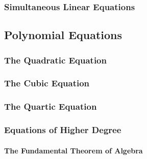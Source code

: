 \subsubsection{Simultaneous Linear Equations}






\subsection{Polynomial Equations}

\subsubsection{The Quadratic Equation}

\subsubsection{The Cubic Equation}

\subsubsection{The Quartic Equation}


\subsubsection{Equations of Higher Degree}

\paragraph{The Fundamental Theorem of Algebra}




